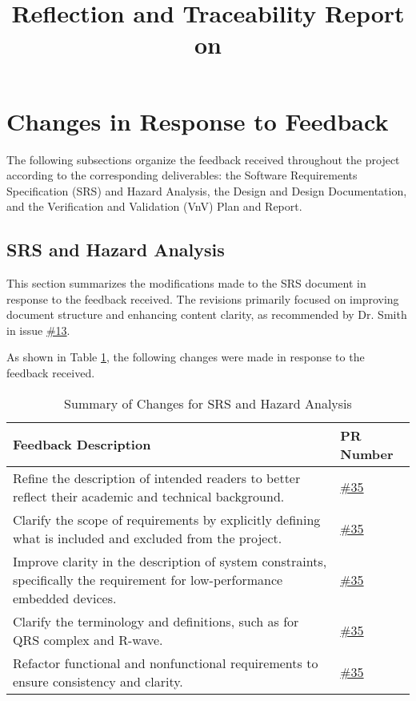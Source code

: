 \documentclass{article}
\title{Reflection and Traceability Report on \progname}
\author{\authname}
\date{}
\begin{document}
\maketitle

\section{Changes in Response to Feedback}

The following subsections organize the feedback received throughout the project
according to the corresponding deliverables: the Software Requirements
Specification (SRS) and Hazard Analysis, the Design and Design Documentation,
and the Verification and Validation (VnV) Plan and Report.

\subsection{SRS and Hazard Analysis}

This section summarizes the modifications made to the SRS document in response
to the feedback received. The revisions primarily focused on improving document
structure and enhancing content clarity, as recommended by Dr. Smith in issue
\href{https://github.com/Lychee-acaca/CAS741/issues/13}{\#13}.

As shown in Table \ref{tab:SRSChanges}, the following changes were made in
response to the feedback received.

\begin{table}[ht] 
\centering
\begin{tabular}{|p{8cm}|p{2.5cm}|}
\hline
\textbf{Feedback Description} & \textbf{PR Number} \\
\hline
Refine the description of intended readers to better reflect their academic and
technical background. &
\href{https://github.com/Lychee-acaca/CAS741/pull/35}{\#35} \\
\hline
Clarify the scope of requirements by explicitly defining what is included and
excluded from the project. &
\href{https://github.com/Lychee-acaca/CAS741/pull/35}{\#35} \\
\hline
Improve clarity in the description of system constraints, specifically the
requirement for low-performance embedded devices. &
\href{https://github.com/Lychee-acaca/CAS741/pull/35}{\#35} \\
\hline
Clarify the terminology and definitions, such as for QRS complex and R-wave. &
\href{https://github.com/Lychee-acaca/CAS741/pull/35}{\#35} \\
\hline
Refactor functional and nonfunctional requirements to ensure consistency and
clarity. & \href{https://github.com/Lychee-acaca/CAS741/pull/35}{\#35} \\
\hline
\end{tabular}
\caption{Summary of Changes for SRS and Hazard Analysis}
\label{tab:SRSChanges}
\end{table}
\end{document}
